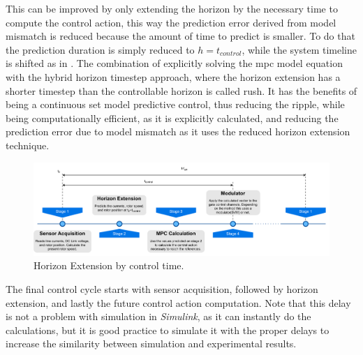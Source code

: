 This can be improved by only extending the horizon by the necessary time to compute the control action, this way the prediction error derived from model mismatch is reduced because the amount of time to predict is smaller. To do that the prediction duration is simply reduced to $h = t_{control}$, while the system timeline is shifted as in . The combination of explicitly solving the \gls{mpc} model equation with the hybrid horizon timestep approach, where the horizon extension has a shorter timestep than the controllable horizon is called \acrfull{rush}. It has the benefits of being a continuous set model predictive control, thus reducing the ripple, while being computationally efficient, as it is explicitly calculated, and reducing the prediction error due to model mismatch as it uses the reduced horizon extension technique.

\begin{figure}[!htb]
	\centering
	\includegraphics[width=1\textwidth]{Figures/Horizon Extension Timeline.pdf}
	\caption[Horizon Extension by control time.]{Horizon Extension by control time.}
	\label{fig:horizon_extend_timeline} %
\end{figure}

The final control cycle starts with sensor acquisition, followed by horizon extension, and lastly the future control action computation. Note that this delay is not a problem with simulation in \textit{Simulink}, as it can instantly do the calculations, but it is good practice to simulate it with the proper delays to increase the similarity between simulation and experimental results.


